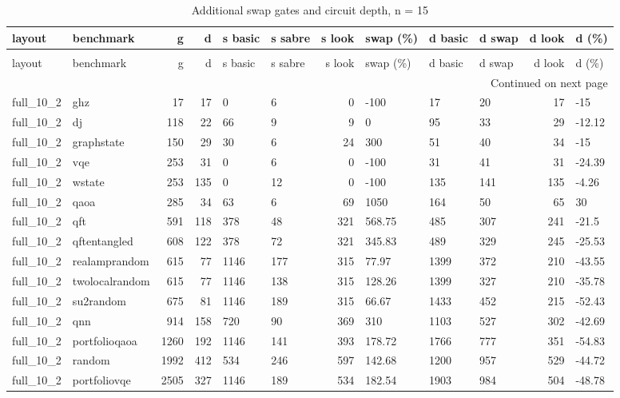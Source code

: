 \begin{longtable}{llrrllrlllrl}
\caption{Additional swap gates and circuit depth, n = 15} \label{benchmark-table-15} \\
\toprule
layout & benchmark & g & d & s basic & s sabre & s look & swap (\%) & d basic & d swap & d look & d (\%) \\
\midrule
\endfirsthead
\caption[]{Additional swap gates and circuit depth, n = 15} \\
\toprule
layout & benchmark & g & d & s basic & s sabre & s look & swap (\%) & d basic & d swap & d look & d (\%) \\
\midrule
\endhead
\midrule
\multicolumn{12}{r}{Continued on next page} \\
\midrule
\endfoot
\bottomrule
\endlastfoot
full\_10\_2 & ghz & 17 & 17 & 0 & 6 & 0 & -100 & 17 & 20 & 17 & -15 \\
full\_10\_2 & dj & 118 & 22 & 66 & 9 & 9 & 0 & 95 & 33 & 29 & -12.12 \\
full\_10\_2 & graphstate & 150 & 29 & 30 & 6 & 24 & 300 & 51 & 40 & 34 & -15 \\
full\_10\_2 & vqe & 253 & 31 & 0 & 6 & 0 & -100 & 31 & 41 & 31 & -24.39 \\
full\_10\_2 & wstate & 253 & 135 & 0 & 12 & 0 & -100 & 135 & 141 & 135 & -4.26 \\
full\_10\_2 & qaoa & 285 & 34 & 63 & 6 & 69 & 1050 & 164 & 50 & 65 & 30 \\
full\_10\_2 & qft & 591 & 118 & 378 & 48 & 321 & 568.75 & 485 & 307 & 241 & -21.5 \\
full\_10\_2 & qftentangled & 608 & 122 & 378 & 72 & 321 & 345.83 & 489 & 329 & 245 & -25.53 \\
full\_10\_2 & realamprandom & 615 & 77 & 1146 & 177 & 315 & 77.97 & 1399 & 372 & 210 & -43.55 \\
full\_10\_2 & twolocalrandom & 615 & 77 & 1146 & 138 & 315 & 128.26 & 1399 & 327 & 210 & -35.78 \\
full\_10\_2 & su2random & 675 & 81 & 1146 & 189 & 315 & 66.67 & 1433 & 452 & 215 & -52.43 \\
full\_10\_2 & qnn & 914 & 158 & 720 & 90 & 369 & 310 & 1103 & 527 & 302 & -42.69 \\
full\_10\_2 & portfolioqaoa & 1260 & 192 & 1146 & 141 & 393 & 178.72 & 1766 & 777 & 351 & -54.83 \\
full\_10\_2 & random & 1992 & 412 & 534 & 246 & 597 & 142.68 & 1200 & 957 & 529 & -44.72 \\
full\_10\_2 & portfoliovqe & 2505 & 327 & 1146 & 189 & 534 & 182.54 & 1903 & 984 & 504 & -48.78 \\

\end{longtable}
